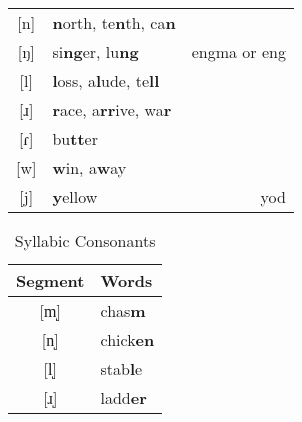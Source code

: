 \documentclass{article}
\begin{document}
\begin{table}[htb]
\begin{tabular}{c | l r}
      {[}n{]}  & \textbf{n}orth, te\textbf{n}th, ca\textbf{n}       & \\
      {[}ŋ{]}  & si\textbf{ng}er, lu\textbf{ng}                     & engma or eng \\
      {[}l{]}  & \textbf{l}oss, a\textbf{l}ude, te\textbf{ll}       & \\
      {[}ɹ{]}  & \textbf{r}ace, a\textbf{rr}ive, wa\textbf{r}       & \\
      {[}ɾ{]}  & bu\textbf{tt}er                                    & \\
      {[}w{]}  & \textbf{w}in, a\textbf{w}ay                        & \\
      {[}j{]}  & \textbf{y}ellow                                    & yod
    \end{tabular}
  \end{table}

  \begin{table}[tb]
    \caption{Syllabic Consonants}
    \centering
    \vspace{0.5cm}
    \begin{tabular}{c | l}
      Segment & Words \\
      \hline
      {[}m̩{]} & chas\textbf{m} \\
      {[}n̩{]} & chick\textbf{en} \\
      {[}l̩{]} & stab\textbf{l}e \\
      {[}ɹ̩{]} & ladd\textbf{er}
    \end{tabular}
  \end{table}
\end{document}

